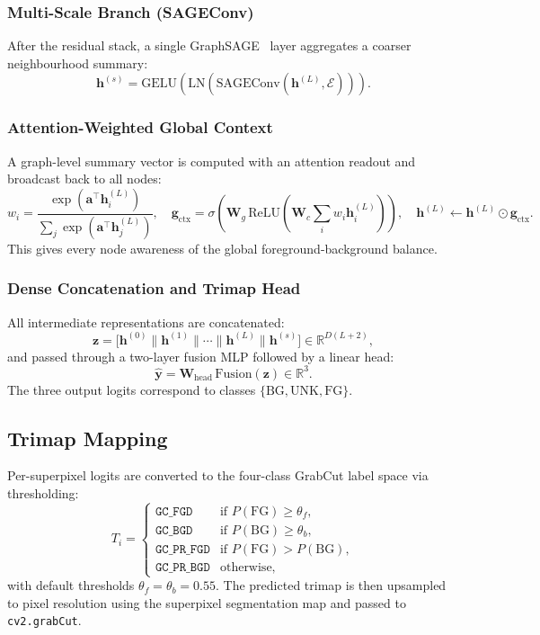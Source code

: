 \documentclass[11pt]{article}
\begin{document}
\subsubsection*{Multi-Scale Branch (SAGEConv)}
After the residual stack, a single GraphSAGE~\cite{hamilton2017inductive} layer aggregates
a coarser neighbourhood summary:
\[
  \mathbf{h}^{(s)} = \text{GELU}\!\left(\text{LN}(\text{SAGEConv}(\mathbf{h}^{(L)}, \mathcal{E}))\right).
\]

\subsubsection*{Attention-Weighted Global Context}
A graph-level summary vector is computed with an attention readout and broadcast back to
all nodes:
\[
  w_i = \frac{\exp(\mathbf{a}^\top \mathbf{h}^{(L)}_i)}
             {\sum_j \exp(\mathbf{a}^\top \mathbf{h}^{(L)}_j)},
  \quad
  \mathbf{g}_{\text{ctx}} = \sigma\!\left(\mathbf{W}_g\,
    \text{ReLU}\!\left(\mathbf{W}_c \textstyle\sum_i w_i \mathbf{h}^{(L)}_i\right)\right),
  \quad
  \mathbf{h}^{(L)} \leftarrow \mathbf{h}^{(L)} \odot \mathbf{g}_{\text{ctx}}.
\]
This gives every node awareness of the global foreground-background balance.

\subsubsection*{Dense Concatenation and Trimap Head}
All intermediate representations are concatenated:
\[
  \mathbf{z} = \bigl[\mathbf{h}^{(0)} \| \mathbf{h}^{(1)} \| \cdots \|
                      \mathbf{h}^{(L)} \| \mathbf{h}^{(s)}\bigr]
  \in \mathbb{R}^{D(L+2)},
\]
and passed through a two-layer fusion MLP followed by a linear head:
\[
  \hat{\mathbf{y}} = \mathbf{W}_{\text{head}}\,\text{Fusion}(\mathbf{z})
  \in \mathbb{R}^{3}.
\]
The three output logits correspond to classes $\{\text{BG}, \text{UNK}, \text{FG}\}$.

\subsection{Trimap Mapping}

Per-superpixel logits are converted to the four-class GrabCut label space via thresholding:
\begin{equation}
  T_i =
  \begin{cases}
    \texttt{GC\_FGD}     & \text{if } P(\text{FG}) \geq \theta_f, \\
    \texttt{GC\_BGD}     & \text{if } P(\text{BG}) \geq \theta_b, \\
    \texttt{GC\_PR\_FGD} & \text{if } P(\text{FG}) > P(\text{BG}), \\
    \texttt{GC\_PR\_BGD} & \text{otherwise},
  \end{cases}
\end{equation}
with default thresholds $\theta_f = \theta_b = 0.55$.
The predicted trimap is then upsampled to pixel resolution using the superpixel segmentation
map and passed to \texttt{cv2.grabCut}.
\end{document}
